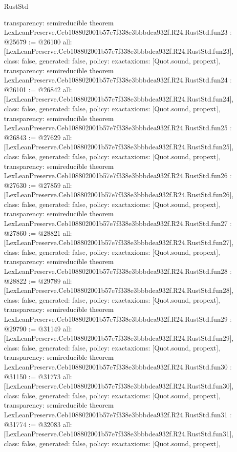 \begin{lexlean}{RustStd}
\begin{coremodule}
{  transparency: semireducible
}
theorem LexLeanPreserve.Ceb108802001b57e7f338e3bbbdea932f.R24.RustStd.fun23 : @25679 := @26100 {
  all: [LexLeanPreserve.Ceb108802001b57e7f338e3bbbdea932f.R24.RustStd.fun23],
  class: false,
  generated: false,
  policy: exact{axioms: [Quot.sound, propext]},
  transparency: semireducible
}
theorem LexLeanPreserve.Ceb108802001b57e7f338e3bbbdea932f.R24.RustStd.fun24 : @26101 := @26842 {
  all: [LexLeanPreserve.Ceb108802001b57e7f338e3bbbdea932f.R24.RustStd.fun24],
  class: false,
  generated: false,
  policy: exact{axioms: [Quot.sound, propext]},
  transparency: semireducible
}
theorem LexLeanPreserve.Ceb108802001b57e7f338e3bbbdea932f.R24.RustStd.fun25 : @26843 := @27629 {
  all: [LexLeanPreserve.Ceb108802001b57e7f338e3bbbdea932f.R24.RustStd.fun25],
  class: false,
  generated: false,
  policy: exact{axioms: [Quot.sound, propext]},
  transparency: semireducible
}
theorem LexLeanPreserve.Ceb108802001b57e7f338e3bbbdea932f.R24.RustStd.fun26 : @27630 := @27859 {
  all: [LexLeanPreserve.Ceb108802001b57e7f338e3bbbdea932f.R24.RustStd.fun26],
  class: false,
  generated: false,
  policy: exact{axioms: [Quot.sound, propext]},
  transparency: semireducible
}
theorem LexLeanPreserve.Ceb108802001b57e7f338e3bbbdea932f.R24.RustStd.fun27 : @27860 := @28821 {
  all: [LexLeanPreserve.Ceb108802001b57e7f338e3bbbdea932f.R24.RustStd.fun27],
  class: false,
  generated: false,
  policy: exact{axioms: [Quot.sound, propext]},
  transparency: semireducible
}
theorem LexLeanPreserve.Ceb108802001b57e7f338e3bbbdea932f.R24.RustStd.fun28 : @28822 := @29789 {
  all: [LexLeanPreserve.Ceb108802001b57e7f338e3bbbdea932f.R24.RustStd.fun28],
  class: false,
  generated: false,
  policy: exact{axioms: [Quot.sound, propext]},
  transparency: semireducible
}
theorem LexLeanPreserve.Ceb108802001b57e7f338e3bbbdea932f.R24.RustStd.fun29 : @29790 := @31149 {
  all: [LexLeanPreserve.Ceb108802001b57e7f338e3bbbdea932f.R24.RustStd.fun29],
  class: false,
  generated: false,
  policy: exact{axioms: [Quot.sound, propext]},
  transparency: semireducible
}
theorem LexLeanPreserve.Ceb108802001b57e7f338e3bbbdea932f.R24.RustStd.fun30 : @31150 := @31773 {
  all: [LexLeanPreserve.Ceb108802001b57e7f338e3bbbdea932f.R24.RustStd.fun30],
  class: false,
  generated: false,
  policy: exact{axioms: [Quot.sound, propext]},
  transparency: semireducible
}
theorem LexLeanPreserve.Ceb108802001b57e7f338e3bbbdea932f.R24.RustStd.fun31 : @31774 := @32083 {
  all: [LexLeanPreserve.Ceb108802001b57e7f338e3bbbdea932f.R24.RustStd.fun31],
  class: false,
  generated: false,
  policy: exact{axioms: [Quot.sound, propext]},
}
\end{coremodule}
\end{lexlean}
